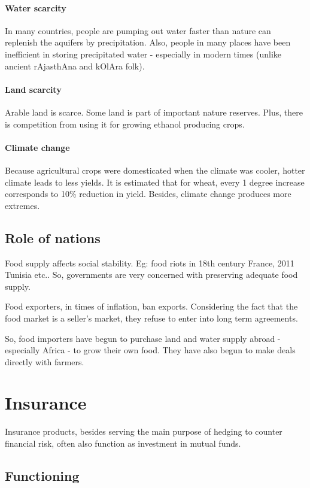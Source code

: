 \documentclass[oneside, article]{memoir}
\begin{document}
\subsubsection{Water scarcity}
In many countries, people are pumping out water faster than nature can replenish the aquifers by precipitation. Also, people in many places have been inefficient in storing precipitated water - especially in modern times (unlike ancient rAjasthAna and kOlAra folk).

\subsubsection{Land scarcity}
Arable land is scarce. Some land is part of important nature reserves. Plus, there is competition from using it for growing ethanol producing crops.

\subsubsection{Climate change}
Because agricultural crops were domesticated when the climate was cooler, hotter climate leads to less yields. It is estimated that for wheat, every 1 degree increase corresponds to 10\% reduction in yield. Besides, climate change produces more extremes.

\section{Role of nations}
Food supply affects social stability. Eg: food riots in 18th century France, 2011 Tunisia etc.. So, governments are very concerned with preserving adequate food supply.

Food exporters, in times of inflation, ban exports. Considering the fact that the food market is a seller's market, they refuse to enter into long term agreements.

So, food importers have begun to purchase land and water supply abroad - especially Africa - to grow their own food. They have also begun to make deals directly with farmers.

\chapter{Insurance}
Insurance products, besides serving the main purpose of hedging to counter financial risk, often also function as investment in mutual funds.

\section{Functioning}
\end{document}

